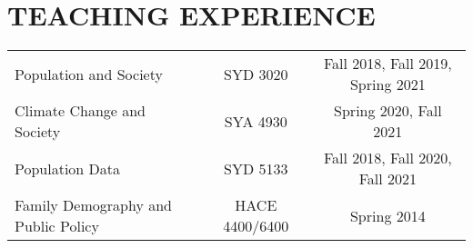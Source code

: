 \documentclass[letterpaper,11pt]{article}
\begin{document}
\section{TEACHING EXPERIENCE}
\begin{tabularx}{\linewidth}{l c c}
\hline
Population and Society & SYD 3020 & Fall 2018, Fall 2019, Spring 2021\\
Climate Change and Society & SYA 4930 & Spring 2020, Fall 2021\\
Population Data & SYD 5133 & Fall 2018, Fall 2020, Fall 2021\\
Family Demography and Public Policy & HACE 4400/6400 & Spring 2014\\

\hline
\end{tabularx}

\end{document}
